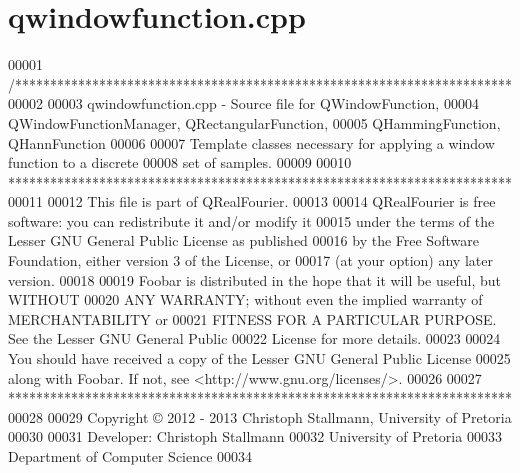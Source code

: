 \hypertarget{a00127_source}{\section{qwindowfunction.\+cpp}
\label{a00127_source}
}

\begin{DoxyCode}
00001 \textcolor{comment}{/***********************************************************************}
00002 \textcolor{comment}{}
00003 \textcolor{comment}{qwindowfunction.cpp - Source file for QWindowFunction,}
00004 \textcolor{comment}{                    QWindowFunctionManager, QRectangularFunction,}
00005 \textcolor{comment}{                    QHammingFunction, QHannFunction}
00006 \textcolor{comment}{}
00007 \textcolor{comment}{Template classes necessary for applying a window function to a discrete}
00008 \textcolor{comment}{set of samples.}
00009 \textcolor{comment}{}
00010 \textcolor{comment}{************************************************************************}
00011 \textcolor{comment}{}
00012 \textcolor{comment}{This file is part of QRealFourier.}
00013 \textcolor{comment}{}
00014 \textcolor{comment}{QRealFourier is free software: you can redistribute it and/or modify it}
00015 \textcolor{comment}{under the terms of the Lesser GNU General Public License as published}
00016 \textcolor{comment}{by the Free Software Foundation, either version 3 of the License, or}
00017 \textcolor{comment}{(at your option) any later version.}
00018 \textcolor{comment}{}
00019 \textcolor{comment}{Foobar is distributed in the hope that it will be useful, but WITHOUT}
00020 \textcolor{comment}{ANY WARRANTY; without even the implied warranty of MERCHANTABILITY or}
00021 \textcolor{comment}{FITNESS FOR A PARTICULAR PURPOSE.  See the Lesser GNU General Public}
00022 \textcolor{comment}{License for more details.}
00023 \textcolor{comment}{}
00024 \textcolor{comment}{You should have received a copy of the Lesser GNU General Public License}
00025 \textcolor{comment}{along with Foobar.  If not, see <http://www.gnu.org/licenses/>.}
00026 \textcolor{comment}{}
00027 \textcolor{comment}{************************************************************************}
00028 \textcolor{comment}{}
00029 \textcolor{comment}{Copyright © 2012 - 2013 Christoph Stallmann, University of Pretoria}
00030 \textcolor{comment}{}
00031 \textcolor{comment}{Developer: Christoph Stallmann}
00032 \textcolor{comment}{University of Pretoria}
00033 \textcolor{comment}{Department of Computer Science}
00034 \textcolor{comment}{}

\end{DoxyCode}
